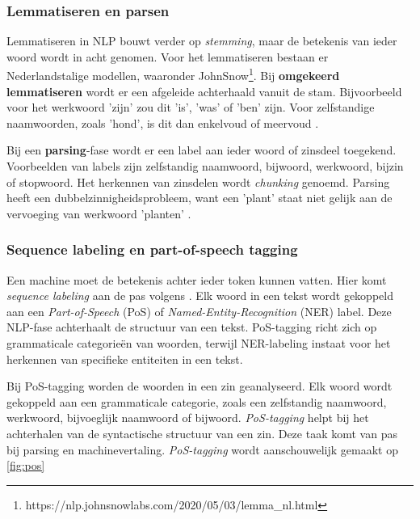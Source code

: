 \subsubsection{Lemmatiseren en parsen}

Lemmatiseren in NLP bouwt verder op \textit{stemming}, maar de betekenis van ieder woord wordt in acht genomen. Voor het lemmatiseren bestaan er Nederlandstalige modellen, waaronder JohnSnow\footnote{https://nlp.johnsnowlabs.com/2020/05/03/lemma\_nl.html}. Bij \textbf{omgekeerd lemmatiseren} wordt er een afgeleide achterhaald vanuit de stam. Bijvoorbeeld voor het werkwoord 'zijn' zou dit 'is', 'was' of 'ben' zijn. Voor zelfstandige naamwoorden, zoals 'hond', is dit dan enkelvoud of meervoud \autocite{Eisenstein2019}.

Bij een \textbf{parsing}-fase wordt er een label aan ieder woord of zinsdeel toegekend. Voorbeelden van labels zijn zelfstandig naamwoord, bijwoord, werkwoord, bijzin of stopwoord. Het herkennen van zinsdelen wordt \textit{chunking} genoemd. Parsing heeft een dubbelzinnigheidsprobleem, want een 'plant' staat niet gelijk aan de vervoeging van werkwoord 'planten' \autocite{Eisenstein2019}.


\subsubsection{Sequence labeling en part-of-speech tagging}

Een machine moet de betekenis achter ieder token kunnen vatten. Hier komt \textit{sequence labeling} aan de pas volgens \textcite{Eisenstein2019}. Elk woord in een tekst wordt gekoppeld aan een \textit{Part-of-Speech} (PoS) of \textit{Named-Entity-Recognition} (NER) label. Deze NLP-fase achterhaalt de structuur van een tekst. PoS-tagging richt zich op grammaticale categorieën van woorden, terwijl NER-labeling instaat voor het herkennen van specifieke entiteiten in een tekst. 

Bij PoS-tagging worden de woorden in een zin geanalyseerd. Elk woord wordt gekoppeld aan een grammaticale categorie, zoals een zelfstandig naamwoord, werkwoord, bijvoeglijk naamwoord of bijwoord. \textit{PoS-tagging} helpt bij het achterhalen van de syntactische structuur van een zin. Deze taak komt van pas bij parsing en machinevertaling. \textit{PoS-tagging} wordt aanschouwelijk gemaakt op \ref{fig:pos}

